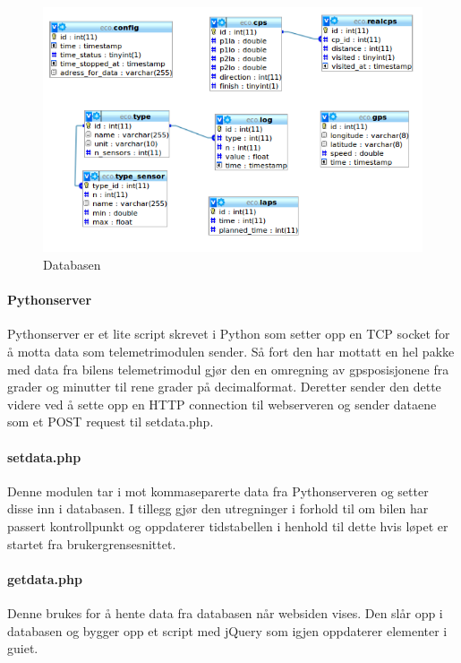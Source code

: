 \begin{figure}[H]
\includegraphics[width=\textwidth]{images/er.png}
\caption{Databasen}
\label{fig:er}
\end{figure}

\paragraph{Pythonserver}
Pythonserver er et lite script skrevet i Python som setter opp en TCP socket for å motta data som telemetrimodulen sender. Så fort den har mottatt en hel pakke med data fra bilens telemetrimodul gjør den en omregning av gpsposisjonene fra grader og minutter til rene grader på decimalformat. Deretter sender den dette videre ved å sette opp en HTTP connection til webserveren og sender dataene som et POST request til setdata.php.
\paragraph{setdata.php}
Denne modulen tar i mot kommaseparerte data fra Pythonserveren og setter disse inn i databasen. I tillegg gjør den utregninger i forhold til om bilen har passert kontrollpunkt og oppdaterer tidstabellen i henhold til dette hvis løpet er startet fra brukergrensesnittet.
\paragraph{getdata.php}
Denne brukes for å hente data fra databasen når websiden vises. Den slår opp i databasen og bygger opp et script med jQuery\cite{jquery} som igjen oppdaterer elementer i guiet.
